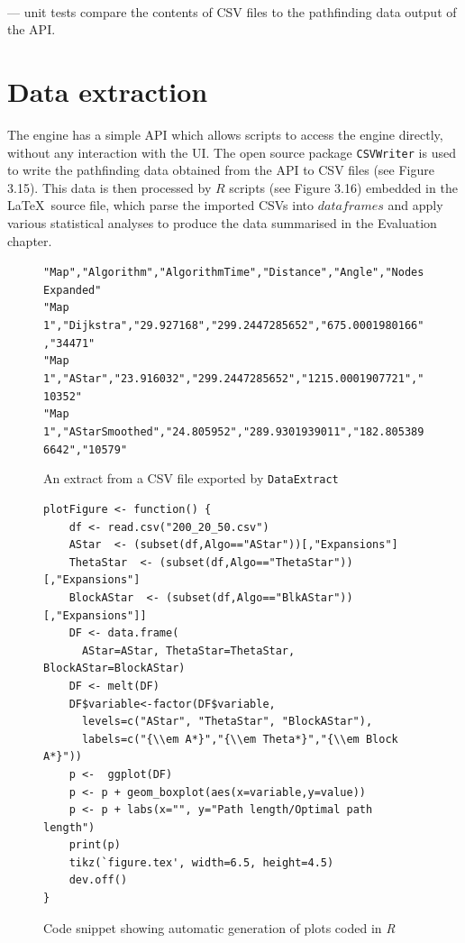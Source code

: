 \documentclass[12pt,notitlepage]{report}
\begin{document}
\\

 --- unit tests compare the contents of CSV files to the pathfinding data output of the API.

\section{Data extraction}

The engine has a simple API which allows scripts to access the engine directly, without any interaction with the UI. The open source package {\tt CSVWriter} is used to write the pathfinding data obtained from the API to CSV files (see Figure 3.15). This data is then processed by $R$ scripts (see Figure 3.16) embedded in the \LaTeX\ source file, which parse the imported CSVs into $dataframes$ and apply various statistical analyses to produce the data summarised in the Evaluation chapter.

\begin{figure}
{\tt "Map","Algorithm","AlgorithmTime","Distance","Angle","NodesExpanded"\\
"Map 1","Dijkstra","29.927168","299.2447285652","675.0001980166","34471"\\
"Map 1","AStar","23.916032","299.2447285652","1215.0001907721","10352"\\
"Map 1","AStarSmoothed","24.805952","289.9301939011","182.8053896642","10579"}
\caption{An extract from a CSV file exported by {\tt DataExtract}}
\end{figure}


\begin{figure}
\begin{lstlisting}
plotFigure <- function() {
    df <- read.csv("200_20_50.csv")
    AStar  <- (subset(df,Algo=="AStar"))[,"Expansions"]
    ThetaStar  <- (subset(df,Algo=="ThetaStar"))[,"Expansions"]
    BlockAStar  <- (subset(df,Algo=="BlkAStar"))[,"Expansions"]] 
    DF <- data.frame(
      AStar=AStar, ThetaStar=ThetaStar, BlockAStar=BlockAStar)
    DF <- melt(DF)
    DF$variable<-factor(DF$variable,
      levels=c("AStar", "ThetaStar", "BlockAStar"),
      labels=c("{\\em A*}","{\\em Theta*}","{\\em Block A*}"))   
    p <-  ggplot(DF)
    p <- p + geom_boxplot(aes(x=variable,y=value))
    p <- p + labs(x="", y="Path length/Optimal path length")
    print(p)
    tikz(`figure.tex', width=6.5, height=4.5)
    dev.off()
}
\end{lstlisting}
\caption{Code snippet showing automatic generation of plots coded in {\em R}}
\end{figure}
\end{document}
